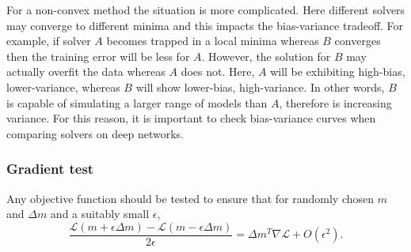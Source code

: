 \documentclass[11pt,twocolumn]{article}
\begin{document}
For a non-convex method the situation is more complicated. Here different solvers may converge to different minima and this impacts the bias-variance tradeoff. For example, if solver $A$ becomes trapped in a local minima whereas $B$ converges then the training error will be less for $A$. However, the solution for $B$ may actually overfit the data whereas $A$ does not. Here, $A$ will be exhibiting high-bias, lower-variance, whereas $B$ will show lower-bias, high-variance. In other words, $B$ is capable of simulating a larger range of models than $A$, therefore is increasing variance. For this reason, it is important to check bias-variance curves when comparing solvers on deep networks.
 
\subsubsection*{Gradient test}\label{grad_test}
Any objective function should be tested to ensure that for randomly chosen $m$ and $\Delta m$ and a suitably small $\epsilon$,
\begin{equation}
\frac{\mathcal{L}(m+\epsilon \Delta m)-\mathcal{L}(m-\epsilon \Delta m)}{2 \epsilon}=\Delta m^T \nabla \mathcal{L} + O(\epsilon^2). 
\end{equation}
 
\end{document}
